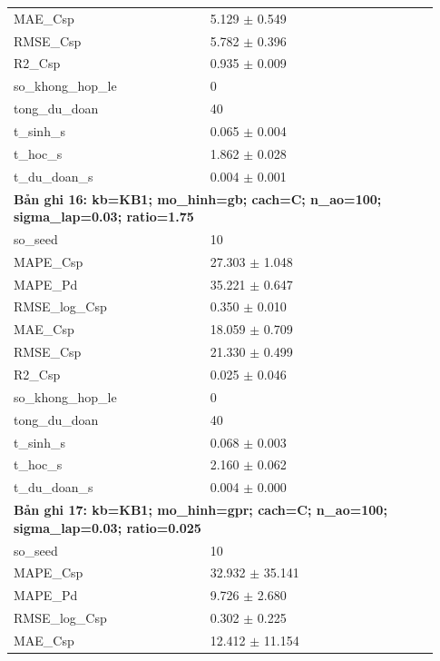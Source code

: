 \begin{longtable}{p{0.43\linewidth}p{0.50\linewidth}}
MAE\_\allowbreak Csp & 5.129 $\pm$ 0.549 \\
RMSE\_\allowbreak Csp & 5.782 $\pm$ 0.396 \\
R2\_\allowbreak Csp & 0.935 $\pm$ 0.009 \\
so\_\allowbreak khong\_\allowbreak hop\_\allowbreak le & 0 \\
tong\_\allowbreak du\_\allowbreak doan & 40 \\
t\_\allowbreak sinh\_\allowbreak s & 0.065 $\pm$ 0.004 \\
t\_\allowbreak hoc\_\allowbreak s & 1.862 $\pm$ 0.028 \\
t\_\allowbreak du\_\allowbreak doan\_\allowbreak s & 0.004 $\pm$ 0.001 \\
\midrule
\multicolumn{2}{p{0.95\linewidth}}{\textbf{Bản ghi 16: kb=KB1; mo\_hinh=gb; cach=C; n\_ao=100; sigma\_lap=0.03; ratio=1.75}} \\
so\_\allowbreak seed & 10 \\
MAPE\_\allowbreak Csp & 27.303 $\pm$ 1.048 \\
MAPE\_\allowbreak Pd & 35.221 $\pm$ 0.647 \\
RMSE\_\allowbreak log\_\allowbreak Csp & 0.350 $\pm$ 0.010 \\
MAE\_\allowbreak Csp & 18.059 $\pm$ 0.709 \\
RMSE\_\allowbreak Csp & 21.330 $\pm$ 0.499 \\
R2\_\allowbreak Csp & 0.025 $\pm$ 0.046 \\
so\_\allowbreak khong\_\allowbreak hop\_\allowbreak le & 0 \\
tong\_\allowbreak du\_\allowbreak doan & 40 \\
t\_\allowbreak sinh\_\allowbreak s & 0.068 $\pm$ 0.003 \\
t\_\allowbreak hoc\_\allowbreak s & 2.160 $\pm$ 0.062 \\
t\_\allowbreak du\_\allowbreak doan\_\allowbreak s & 0.004 $\pm$ 0.000 \\
\midrule
\multicolumn{2}{p{0.95\linewidth}}{\textbf{Bản ghi 17: kb=KB1; mo\_hinh=gpr; cach=C; n\_ao=100; sigma\_lap=0.03; ratio=0.025}} \\
so\_\allowbreak seed & 10 \\
MAPE\_\allowbreak Csp & 32.932 $\pm$ 35.141 \\
MAPE\_\allowbreak Pd & 9.726 $\pm$ 2.680 \\
RMSE\_\allowbreak log\_\allowbreak Csp & 0.302 $\pm$ 0.225 \\
MAE\_\allowbreak Csp & 12.412 $\pm$ 11.154 \\

\end{longtable}
